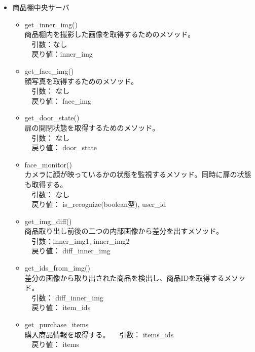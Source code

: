 \documentclass[a4, dvipdfmx, uplatex]{jsarticle}
\begin{document}
\begin{itemize}
\begin{itemize}
\end{itemize}

\item 商品棚中央サーバ \\

\begin{itemize}
\item get\_inner\_img() \\
商品棚内を撮影した画像を取得するためのメソッド。 \\
　引数：なし \\
　戻り値：inner\_img \\

\item get\_face\_img() \\
顔写真を取得するためのメソッド。 \\
　引数： なし \\
　戻り値： face\_img\\

\item get\_door\_state() \\
扉の開閉状態を取得するためのメソッド。\\
　引数： なし \\
　戻り値： door\_state \\

\item face\_monitor() \\
カメラに顔が映っているかの状態を監視するメソッド。同時に扉の状態も取得する。 \\
　引数： なし \\
　戻り値： is\_recognize(boolean型), user\_id \\

\item get\_img\_diff() \\
商品取り出し前後の二つの内部画像から差分を出すメソッド。 \\
　引数：inner\_img1, inner\_img2 \\
　戻り値： diff\_inner\_img \\

\item get\_ids\_from\_img() \\
差分の画像から取り出された商品を検出し、商品IDを取得するメソッド。 \\
　引数： diff\_inner\_img \\
　戻り値： item\_ids \\

\item get\_purchase\_items \\
購入商品情報を取得する。
　引数： items_ids \\
　戻り値： items \\


\end{itemize}
\end{itemize}
\end{document}
